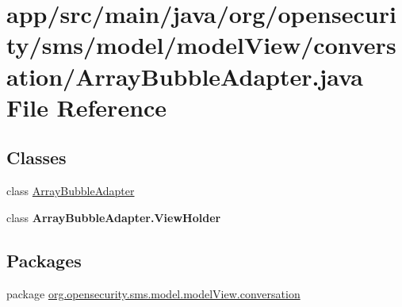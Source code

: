 \hypertarget{a00020}{\section{app/src/main/java/org/opensecurity/sms/model/model\+View/conversation/\+Array\+Bubble\+Adapter.java File Reference}
\label{a00020}
}
\subsection*{Classes}
\begin{DoxyCompactItemize}
\item 
class \hyperlink{a00002}{Array\+Bubble\+Adapter}
\item 
class {\bfseries Array\+Bubble\+Adapter.\+View\+Holder}
\end{DoxyCompactItemize}
\subsection*{Packages}
\begin{DoxyCompactItemize}
\item 
package \hyperlink{a00038}{org.\+opensecurity.\+sms.\+model.\+model\+View.\+conversation}
\end{DoxyCompactItemize}

